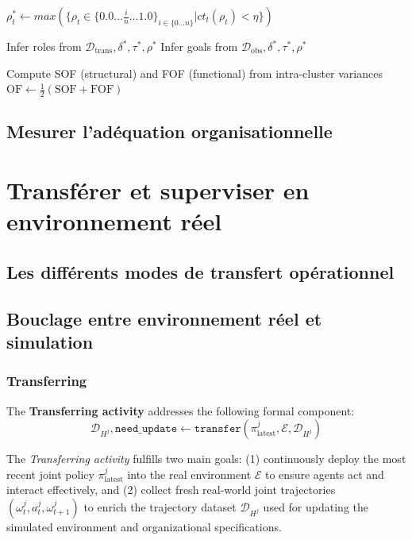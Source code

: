 \begin{algorithm}[H]
{        
        $\rho_t^* \gets max(\{\rho_t \in \{0.0\dots\frac{i}{n}\dots1.0\}_{i \in \{0\dots n\}} | ct_t(\rho_t) < \eta \})$ 

    }

    Infer roles from $\mathcal{D}_{\text{trans}}, \delta^*, \tau^*, \rho^*$ \;
    Infer goals from $\mathcal{D}_{\text{obs}}, \delta^*, \tau^*, \rho^*$ \;

    Compute SOF (structural) and FOF (functional) from intra-cluster variances \;
    $\text{OF} \gets \frac{1}{2}(\text{SOF} + \text{FOF})$ \;

\end{algorithm}



\section{Mesurer l'adéquation organisationnelle}

\chapter{Transférer et superviser en environnement réel}
\section{Les différents modes de transfert opérationnel}
\section{Bouclage entre environnement réel et simulation}


\subsection{Transferring}\label{sec:transferring}

\noindent The \textbf{Transferring activity} addresses the following formal component:
\[
\mathcal{D}_{H^j}, \texttt{need\_update} \gets \texttt{transfer}(\pi^j_{\text{latest}}, \mathcal{E}, \mathcal{D}_{H^j})
\]

The \textit{Transferring activity} fulfills two main goals: (1) continuously deploy the most recent joint policy $\pi^j_{\text{latest}}$ into the real environment $\mathcal{E}$ to ensure agents act and interact effectively, and (2) collect fresh real-world joint trajectories $(\omega^j_t, a^j_t, \omega^j_{t+1})$ to enrich the trajectory dataset $\mathcal{D}_{H^j}$ used for updating the simulated environment and organizational specifications.

